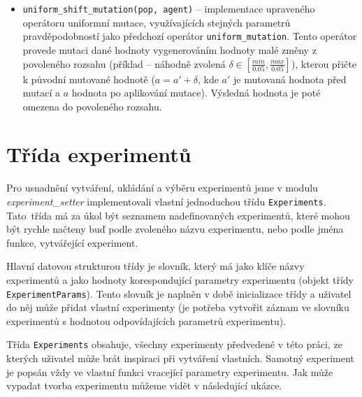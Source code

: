 \begin{itemize}
{        probability}, \emph{action mutation probability}, \emph{body mutation
        probability}),
    \item \texttt{uniform\_shift\_mutation(pop, agent)} -- implementace
        upraveného operátoru uniformní mutace, využívajících stejných parametrů
        pravděpodobností jako předchozí operátor \texttt{uniform\_mutation}.
        Tento operátor provede mutaci dané hodnoty vygenerováním hodnoty malé
        změny z povoleného rozsahu (příklad -- náhodně zvolená
        $\delta\in[\frac{min}{0.05}, \frac{max}{0.05}]$), kterou přičte k
        původní mutované hodnotě ($a = a' + \delta$, kde $a'$ je mutovaná
        hodnota před mutací a $a$ hodnota po aplikování mutace). Výsledná
        hodnota je poté omezena do povoleného rozsahu.
\end{itemize}

\section{Třída experimentů} \label{imp:experimentsetter}
Pro usnadnění vytváření, ukládání a výběru experimentů jsme v modulu
\emph{experiment\_setter} implementovali vlastní jednoduchou třídu
\texttt{Experiments}. Tato~třída má za úkol být seznamem nadefinovaných
experimentů, které mohou být rychle načteny buď podle zvoleného názvu
experimentu, nebo podle jména funkce, vytvářející experiment.

Hlavní datovou strukturou třídy je slovník, který má jako klíče názvy
experimentů a jako hodnoty korespondující parametry experimentu (objekt třídy
\texttt{ExperimentParams}). Tento slovník je naplněn v době inicializace třídy
a uživatel do něj může přidat vlastní experimenty (je potřeba vytvořit záznam
ve slovníku experimentů s hodnotou odpovídajících parametrů experimentu).

Třída \texttt{Experiments} obsahuje, všechny experimenty předvedené v této
práci, ze kterých uživatel může brát inspiraci při vytváření vlastních. Samotný
experiment je popsán vždy ve vlastní funkci vracející parametry experimentu.
Jak může vypadat tvorba experimentu můžeme vidět v následující ukázce.

